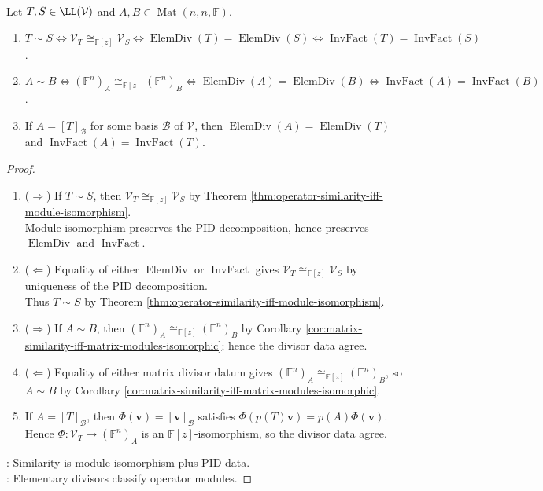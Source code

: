 \begin{theorem} \label{thm:elementary-divisors-complete-similarity-invariant} \\
Let $T,S\in\LL(\mathcal{V})$ and $A,B\in\operatorname{Mat}(n,n,\mathbb{F})$.
\begin{enumerate}[label=(\roman*)]
\setlength{\itemsep}{0pt}
\item $T\sim S\Longleftrightarrow\mathcal{V}_T\cong_{\mathbb{F}[z]}\mathcal{V}_S\Longleftrightarrow\operatorname{ElemDiv}(T)=\operatorname{ElemDiv}(S)\Longleftrightarrow\operatorname{InvFact}(T)=\operatorname{InvFact}(S)$.
\item $A\sim B\Longleftrightarrow(\mathbb{F}^n)_A\cong_{\mathbb{F}[z]}(\mathbb{F}^n)_B\Longleftrightarrow\operatorname{ElemDiv}(A)=\operatorname{ElemDiv}(B)\Longleftrightarrow\operatorname{InvFact}(A)=\operatorname{InvFact}(B)$.
\item If $A=[T]_{\mathcal{B}}$ for some basis $\mathcal{B}$ of $\mathcal{V}$, then $\operatorname{ElemDiv}(A)=\operatorname{ElemDiv}(T)$ and $\operatorname{InvFact}(A)=\operatorname{InvFact}(T)$.
\end{enumerate}
\begin{proof}
\begin{enumerate}[label=(\roman*).]
\setlength{\itemsep}{0pt}
\item[$(i)$]($\Rightarrow$) If $T\sim S$, then $\mathcal{V}_T\cong_{\mathbb{F}[z]}\mathcal{V}_S$ by Theorem \ref{thm:operator-similarity-iff-module-isomorphism}.\\
Module isomorphism preserves the PID decomposition, hence preserves $\operatorname{ElemDiv}$ and $\operatorname{InvFact}$.
\item[$(i)$]($\Leftarrow$) Equality of either $\operatorname{ElemDiv}$ or $\operatorname{InvFact}$ gives $\mathcal{V}_T\cong_{\mathbb{F}[z]}\mathcal{V}_S$ by uniqueness of the PID decomposition.\\
Thus $T\sim S$ by Theorem \ref{thm:operator-similarity-iff-module-isomorphism}.
\item[$(ii)$]($\Rightarrow$) If $A\sim B$, then $(\mathbb{F}^n)_A\cong_{\mathbb{F}[z]}(\mathbb{F}^n)_B$ by Corollary \ref{cor:matrix-similarity-iff-matrix-modules-isomorphic}; hence the divisor data agree.
\item[$(ii)$]($\Leftarrow$) Equality of either matrix divisor datum gives $(\mathbb{F}^n)_A\cong_{\mathbb{F}[z]}(\mathbb{F}^n)_B$, so $A\sim B$ by Corollary \ref{cor:matrix-similarity-iff-matrix-modules-isomorphic}.
\item[$(iii)$] If $A=[T]_{\mathcal{B}}$, then $\Phi(\mathbf{v})=[\mathbf{v}]_{\mathcal{B}}$ satisfies $\Phi(p(T)\mathbf{v})=p(A)\Phi(\mathbf{v})$.\\
Hence $\Phi:\mathcal{V}_T\to(\mathbb{F}^n)_A$ is an $\mathbb{F}[z]$-isomorphism, so the divisor data agree.
\end{enumerate}
: Similarity is module isomorphism plus PID data.\\
: Elementary divisors classify operator modules.
\end{proof}
\end{theorem}

